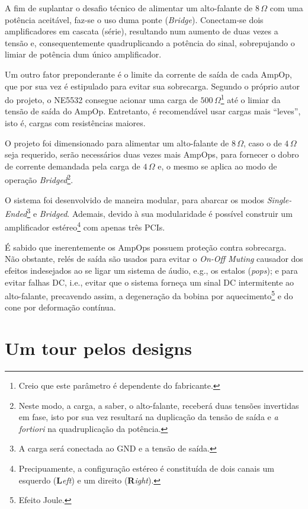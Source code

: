 \documentclass[12pt, a4paper, leqno, twoside]{book}
\def\ohm{\,\Omega}
\def\ampop{AmpOp}
\begin{document}
  A fim de suplantar o desafio t\'ecnico de alimentar um alto-falante de $8\ohm$ com uma pot\^encia aceit\'avel, faz-se o uso duma ponte ({\it Bridge}). Conectam-se dois amplificadores em cascata (s\'erie), resultando num aumento de duas vezes a tens\~ao e, consequentemente quadruplicando a pot\^encia do sinal, sobrepujando o limiar de pot\^encia dum \'unico amplificador. 

  Um outro fator preponderante \'e o limite da corrente de sa\'ida de cada \ampop, que por sua vez \'e estipulado para evitar sua sobrecarga. Segundo o pr\'oprio autor do projeto, o NE5532 consegue acionar uma carga de $500\ohm$\footnote{Creio que este par\^ametro \'e dependente do fabricante.} at\'e o limiar da tens\~ao de sa\'ida do \ampop. Entretanto, \'e recomend\'avel usar cargas mais ``leves'', isto \'e, cargas com resist\^encias maiores. 

  O projeto foi dimensionado para alimentar um alto-falante de $8\ohm$, caso o de $4\ohm$ seja requerido, ser\~ao necess\'arios duas vezes mais \ampop{s}, para fornecer o dobro de corrente demandada pela carga de $4\ohm$ e, o mesmo se aplica ao modo de opera\c c\~ao {\it Bridged\/}\footnote{Neste modo, a carga, a saber, o alto-falante, receber\'a duas tens\~oes invertidas em fase, isto por sua vez resultar\'a na duplica\c c\~ao da tens\~ao de sa\'ida e {\it a fortiori} na quadruplica\c c\~ao da pot\^encia.}. 

  O sistema foi desenvolvido de maneira modular, para abarcar os modos {\it Single-Ended\/}\footnote{A carga ser\'a conectada ao GND e a tens\~ao de sa\'ida.} e {\it Bridged}. Ademais, devido \`a sua modularidade \'e poss\'ivel construir um amplificador est\'ereo\footnote{Precipuamente, a configura\c c\~ao est\'ereo \'e constitu\'ida de dois canais um esquerdo ({\bf L}{\it eft}) e um direito ({\bf R}{\it ight}).} com apenas tr\^es PCIs.

  \'E sabido que inerentemente os \ampop{s} possuem prote\c c\~ao contra sobrecarga. N\~ao obstante, rel\'es de sa\'ida s\~ao usados para evitar o {\it On-Off Muting} causador dos efeitos indesejados ao se ligar um sistema de \'audio, e.g., os estalos ({\it pops}); e para evitar falhas DC, i.e., evitar que o sistema forneça um sinal DC intermitente ao alto-falante, precavendo assim, a degenera\c c\~ao da bobina por aquecimento\footnote{Efeito Joule.} e do cone por deforma\c c\~ao cont\'inua. 
  \section{Um tour pelos designs}
\end{document}
